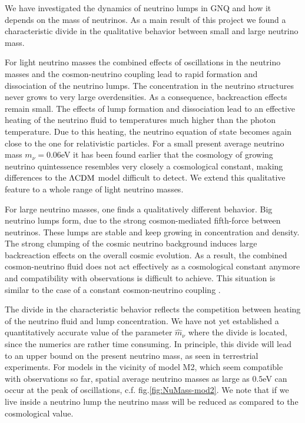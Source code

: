 We have investigated the dynamics of neutrino lumps in GNQ and how it depends on the mass of neutrinos. As a main
result of this project we found a characteristic divide in the qualitative
behavior between small and large neutrino mass.

For light neutrino masses the combined effects of oscillations in
the neutrino masses and the cosmon-neutrino coupling lead to rapid
formation and dissociation of the neutrino lumps. The concentration
in the neutrino structures never grows to very large overdensities.
As a consequence, backreaction effects remain small. The effects of
lump formation and dissociation lead to an effective heating of the
neutrino fluid to temperatures much higher than the photon temperature.
Due to this heating, the neutrino equation of state becomes again
close to the one for relativistic particles. For a small present average
neutrino mass $m_{\nu}=0.06$eV it has been found earlier \cite{pettorino_neutrino_2010}
that the cosmology of growing neutrino quintessence resembles very
closely a cosmological constant, making differences to the $\Lambda\mathrm{CDM}$
model difficult to detect. We extend this qualitative feature to a
whole range of light neutrino masses.

For large neutrino masses, one finds a qualitatively different behavior.
Big neutrino lumps form, due to the strong cosmon-mediated fifth-force
between neutrinos. These lumps are stable and keep growing in concentration
and density. The strong clumping of the cosmic neutrino background
induces large backreaction effects on the overall cosmic evolution.
As a result, the combined cosmon-neutrino fluid does not act effectively
as a cosmological constant anymore and compatibility with observations
is difficult to achieve. This situation is similar to the case of
a constant cosmon-neutrino coupling \cite{fuhrer_backreaction_2015}.

The divide in the characteristic behavior reflects the competition
between heating of the neutrino fluid and lump concentration. We have
not yet established a quantitatively accurate value of the parameter
$\hat{m}_{\nu}$ where the divide is located, since the numerics are
rather time consuming. In principle, this divide will lead to an upper
bound on the present neutrino mass, as seen in terrestrial experiments.
For models in the vicinity of model M2, which seem compatible with
observations so far, spatial average neutrino masses as large as $0.5$eV
can occur at the peak of oscillations, c.f. fig.\ref{fig:NuMass-mod2}.
We note that if we live inside a neutrino lump the neutrino mass will
be reduced as compared to the cosmological value.

